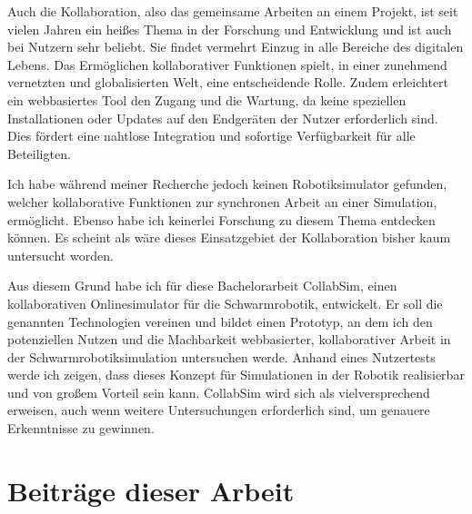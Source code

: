 \documentclass[german,version-2020-11]{uzl-thesis}
\begin{document}
Auch die Kollaboration, also das gemeinsame Arbeiten an einem Projekt, ist seit vielen Jahren ein heißes Thema in der Forschung und Entwicklung und ist auch bei Nutzern sehr beliebt. 
Sie findet vermehrt Einzug in alle Bereiche des digitalen Lebens. 
Das Ermöglichen kollaborativer Funktionen spielt, in einer zunehmend vernetzten und globalisierten Welt, eine entscheidende Rolle.
Zudem erleichtert ein webbasiertes Tool den Zugang und die Wartung, da keine speziellen Installationen oder Updates auf den Endgeräten der Nutzer erforderlich sind. 
Dies fördert eine nahtlose Integration und sofortige Verfügbarkeit für alle Beteiligten.


Ich habe während meiner Recherche jedoch keinen Robotiksimulator gefunden, welcher kollaborative Funktionen zur synchronen Arbeit an einer Simulation, ermöglicht.
Ebenso habe ich keinerlei Forschung zu diesem Thema entdecken können. Es scheint als wäre dieses Einsatzgebiet der Kollaboration bisher kaum untersucht worden.

Aus diesem Grund habe ich für diese Bachelorarbeit CollabSim, einen kollaborativen Onlinesimulator für die Schwarmrobotik, entwickelt. 
Er soll die genannten Technologien vereinen und bildet einen Prototyp, an dem ich den potenziellen Nutzen und die Machbarkeit webbasierter, kollaborativer Arbeit in der Schwarmrobotiksimulation untersuchen werde.
Anhand eines Nutzertests werde ich zeigen, dass dieses Konzept für Simulationen in der Robotik realisierbar und von großem Vorteil sein kann. 
CollabSim wird sich als vielversprechend erweisen, auch wenn weitere Untersuchungen erforderlich sind, um genauere Erkenntnisse zu gewinnen. 







\section{Beiträge dieser Arbeit}
\end{document}
